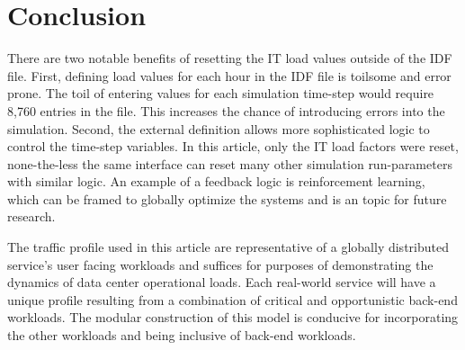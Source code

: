 \section*{Conclusion}
There are two notable benefits of resetting the IT load values outside of the IDF file. First, defining load values for each hour in the IDF file is toilsome and error prone. The toil of entering values for each simulation time-step would require 8,760 entries in the file. This increases the chance of introducing errors into the simulation. Second, the external definition allows more sophisticated logic to control the time-step variables. In this article, only the IT load factors were reset, none-the-less the same interface can reset many other simulation run-parameters with similar logic. An example of a feedback logic is reinforcement learning, which can be framed to globally optimize the systems and is an topic for future research. 

The traffic profile used in this article are representative of a globally distributed service’s user facing workloads and suffices for purposes of demonstrating the dynamics of data center operational loads. Each real-world service will have a unique profile resulting from a combination of critical and opportunistic back-end workloads. The modular construction of this model is conducive for incorporating the other workloads and being inclusive of back-end workloads.